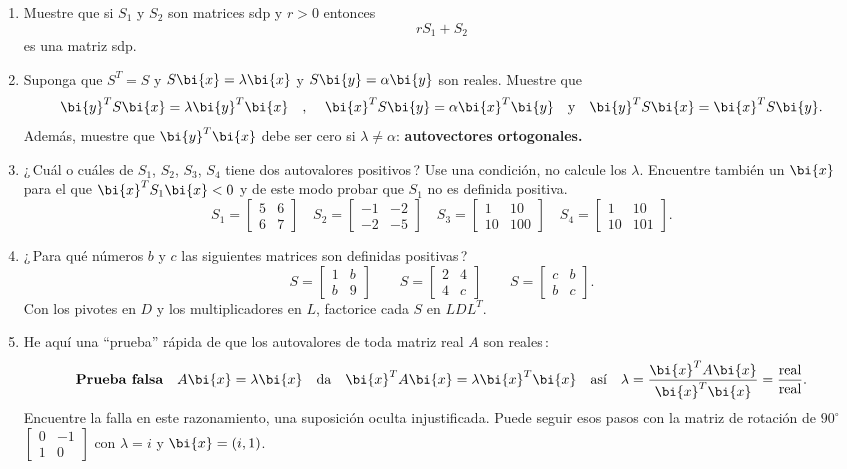 \begin{enumerate}

\item Muestre que si $S_1$ y $S_2$ son matrices sdp y $r>0$ entonces
\[rS_1 + S_2\]
 es una matriz sdp.
 
\item Suponga que $S^T=S$ y $S\bi{x}=\lambda\bi{x}$ y $S\bi{y}=\alpha\bi{y}$ son reales. Muestre que
$$
\bi{y}^T S\bi{x}=\lambda\bi{y}^T\bi{x}\quad\text{, }\quad\bi{x}^T S\bi{y}=\alpha\bi{x}^T\bi{y}\quad\text{y}\quad\bi{y}^T S\bi{x}=\bi{x}^T S\bi{y}.
$$
Además, muestre que $\bi{y}^T\bi{x}$ debe ser cero si $\lambda\neq\alpha$: \textbf{autovectores ortogonales.} 

\item ¿\,Cuál o cuáles de $S_1$, $S_2$, $S_3$, $S_4$ tiene dos autovalores positivos\,? Use una condición, no calcule los $\lambda$. Encuentre también un $\bi{x}$ para el que $\bi{x}^T S_1 \bi{x} < 0$ y de este modo probar que $S_1$ no es definida positiva.
\[
S_1=\begin{bmatrix} 5&6\\ 6&7\end{bmatrix}\quad
S_2=\begin{bmatrix}  -1 & -2 \\  -2 &
    -5\end{bmatrix}\quad S_3=\begin{bmatrix} 1&10\\
  10&100\end{bmatrix} \quad S_4=\begin{bmatrix} 1&10\\
  10&101\end{bmatrix}.
\]

\item ¿\,Para qué números $b$ y $c$ las siguientes matrices son definidas positivas\,?
\[
S=\begin{bmatrix} 1&b\\ b&9\end{bmatrix}\qquad
S=\begin{bmatrix} 2&4\\ 4&c\end{bmatrix}\qquad
S=\begin{bmatrix} c&b\\ b&c\end{bmatrix}.
\]
Con los pivotes en $D$ y los multiplicadores en $L$, factorice cada $S$ en $LDL^T$.

\item He aquí una ``prueba'' rápida de que los autovalores de toda matriz real $A$ son reales\,:
\[
\textbf{Prueba falsa}\index{Prueba falsa}\quad
A\bi{x}=\lambda\bi{x}\quad\text{da}\quad \bi{x}^T A\bi{x}=\lambda\bi{x}^T \bi{x} \quad\text{así}\quad\lambda= \frac{\bi{x}^T A\bi{x}}{\bi{x}^T \bi{x}} = \frac{\text{real}}{\text{real}}.
\]
Encuentre la falla en este razonamiento, una suposición oculta injustificada. Puede seguir esos pasos con la matriz de rotación de $90^\circ$ $\begin{bmatrix}0 & -1\\ 1& 0\end{bmatrix}$ con $\lambda=i$ y $\bi{x}=(i,1)$.


\end{enumerate}
